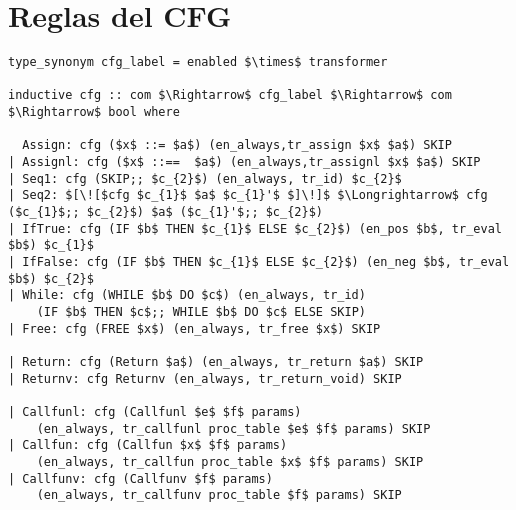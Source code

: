 \chapter{Reglas del CFG}
\label{ap:cfg_rules}

\begin{lstlisting}[frame=single, mathescape=true]
type_synonym cfg_label = enabled $\times$ transformer

inductive cfg :: com $\Rightarrow$ cfg_label $\Rightarrow$ com $\Rightarrow$ bool where

  Assign: cfg ($x$ ::= $a$) (en_always,tr_assign $x$ $a$) SKIP
| Assignl: cfg ($x$ ::==  $a$) (en_always,tr_assignl $x$ $a$) SKIP
| Seq1: cfg (SKIP;; $c_{2}$) (en_always, tr_id) $c_{2}$
| Seq2: $[\![$cfg $c_{1}$ $a$ $c_{1}'$ $]\!]$ $\Longrightarrow$ cfg ($c_{1}$;; $c_{2}$) $a$ ($c_{1}'$;; $c_{2}$)
| IfTrue: cfg (IF $b$ THEN $c_{1}$ ELSE $c_{2}$) (en_pos $b$, tr_eval $b$) $c_{1}$
| IfFalse: cfg (IF $b$ THEN $c_{1}$ ELSE $c_{2}$) (en_neg $b$, tr_eval $b$) $c_{2}$
| While: cfg (WHILE $b$ DO $c$) (en_always, tr_id)
    (IF $b$ THEN $c$;; WHILE $b$ DO $c$ ELSE SKIP)
| Free: cfg (FREE $x$) (en_always, tr_free $x$) SKIP

| Return: cfg (Return $a$) (en_always, tr_return $a$) SKIP
| Returnv: cfg Returnv (en_always, tr_return_void) SKIP

| Callfunl: cfg (Callfunl $e$ $f$ params)
    (en_always, tr_callfunl proc_table $e$ $f$ params) SKIP
| Callfun: cfg (Callfun $x$ $f$ params)
    (en_always, tr_callfun proc_table $x$ $f$ params) SKIP
| Callfunv: cfg (Callfunv $f$ params)
    (en_always, tr_callfunv proc_table $f$ params) SKIP
\end{lstlisting}
